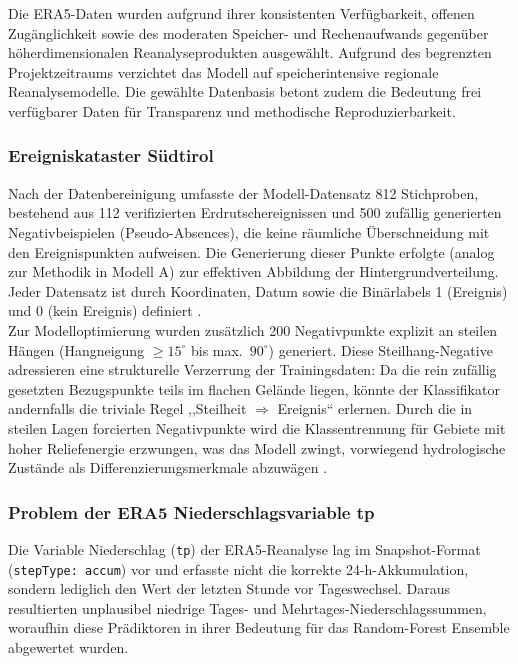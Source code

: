 \documentclass[../main.tex]{subfiles}
\begin{document}
Die ERA5-Daten wurden aufgrund ihrer konsistenten Verfügbarkeit, offenen Zugänglichkeit sowie des moderaten Speicher- und Rechenaufwands gegenüber höherdimensionalen Reanalyseprodukten ausgewählt.
Aufgrund des begrenzten Projektzeitraums verzichtet das Modell auf speicherintensive regionale Reanalysemodelle.
Die gewählte Datenbasis betont zudem die Bedeutung frei verfügbarer Daten für Transparenz und methodische Reproduzierbarkeit.

\subsubsection{Ereigniskataster Südtirol}
Nach der Datenbereinigung umfasste der Modell-Datensatz 812 Stichproben, bestehend aus 112 verifizierten Erdrutschereignissen und 500 zufällig generierten Negativbeispielen (Pseudo-Absences), die keine räumliche Überschneidung mit den Ereignispunkten aufweisen.
Die Generierung dieser Punkte erfolgte (analog zur Methodik in Modell A) zur effektiven Abbildung der Hintergrundverteilung. Jeder Datensatz ist durch Koordinaten, Datum sowie die Binärlabels 1 (Ereignis) und 0 (kein Ereignis) definiert \autocite{trigilaQualityAssessmentItalian2010a}. \\

Zur Modelloptimierung wurden zusätzlich 200 Negativpunkte explizit an steilen Hängen (Hangneigung $\ge 15^\circ$ bis max.\ $90^\circ$) generiert.
Diese Steilhang-Negative adressieren eine strukturelle Verzerrung der Trainingsdaten: Da die rein zufällig gesetzten Bezugspunkte teils im flachen Gelände liegen, könnte der Klassifikator andernfalls die triviale Regel ,,Steilheit $\Rightarrow$ Ereignis`` erlernen. Durch die in steilen Lagen forcierten Negativpunkte wird die Klassentrennung für Gebiete mit hoher Reliefenergie erzwungen, was das Modell zwingt, vorwiegend hydrologische Zustände als Differenzierungsmerkmale abzuwägen \autocites{stegerChallengeTrivialAreas2017a,stegerCorrelationDoesNot2021}.

\subsubsection{Problem der ERA5 Niederschlagsvariable tp}
Die Variable Niederschlag (\texttt{tp}) der ERA5-Reanalyse lag im Snapshot-Format (\texttt{stepType: accum}) vor und erfasste nicht die korrekte 24-h-Akkumulation, sondern lediglich den Wert der letzten Stunde vor Tageswechsel. Daraus resultierten unplausibel niedrige Tages- und Mehrtages-Niederschlagssummen, woraufhin diese Prädiktoren in ihrer Bedeutung für das Random-Forest Ensemble abgewertet wurden. \\
\end{document}
